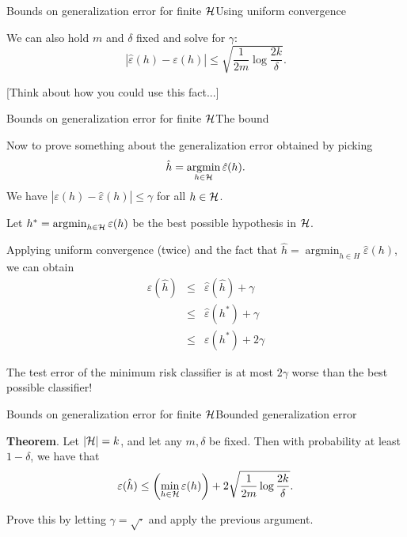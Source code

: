 \documentclass{beamer}
\DeclareMathOperator*{\argmin}{argmin}
\begin{document}
\begin{frame}{Bounds on generalization error for finite $\cal H$}{Using uniform convergence}

  We can also hold $m$ and $\delta$ fixed and solve for $\gamma$:
  \[ |\hat{\varepsilon}(h) - \varepsilon(h)| \le \sqrt{\frac{1}{2m}\log\frac{2k}{\delta}} .\]

  \medskip

  [Think about how you could use this fact...]

\end{frame}


\begin{frame}{Bounds on generalization error for finite $\cal H$}{The bound}

  Now to prove something about the generalization error
  obtained by picking
  \[ \hat{h} = \argmin_{h\in \cal H} \hat{\varepsilon}(h) .\]
  We have $|\varepsilon(h)-\hat{\varepsilon}(h)| \le \gamma$ for all
  $h \in \cal H$.

  \medskip

  Let $h^* = \argmin_{h \in \cal H} \varepsilon(h)$ be the best possible
  hypothesis in $\cal H$.

  \medskip

  Applying uniform convergence (twice) and the fact that
  $\hat{h} = \argmin_{h \in H}\hat{\varepsilon}(h)$, we can obtain
  \begin{eqnarray*}
    \varepsilon(\hat{h}) & \le & \hat{\varepsilon}(\hat{h}) + \gamma \\
    & \le & \hat{\varepsilon}(h^*) + \gamma \\
    & \le & \varepsilon(h^*)+2\gamma
  \end{eqnarray*}

  \medskip

  \alert{The test error of the minimum risk classifier is at most
  $2\gamma$ worse than the best possible classifier!}
  
\end{frame}


\begin{frame}{Bounds on generalization error for finite $\cal H$}{Bounded generalization error}

  \textbf{Theorem}. Let $|{\cal H}| = k$, and let any $m, \delta$ be
  fixed. Then with probability at least $1-\delta$, we have that
  \[ \varepsilon(\hat{h}) \le \left( \min_{h\in \cal H} \varepsilon(h) \right)
  + 2 \sqrt{\frac{1}{2m}\log\frac{2k}{\delta}} .\]

  \medskip

  Prove this by letting $\gamma = \sqrt{\cdot}$ and apply the previous
  argument.
  
\end{frame}
\end{document}
